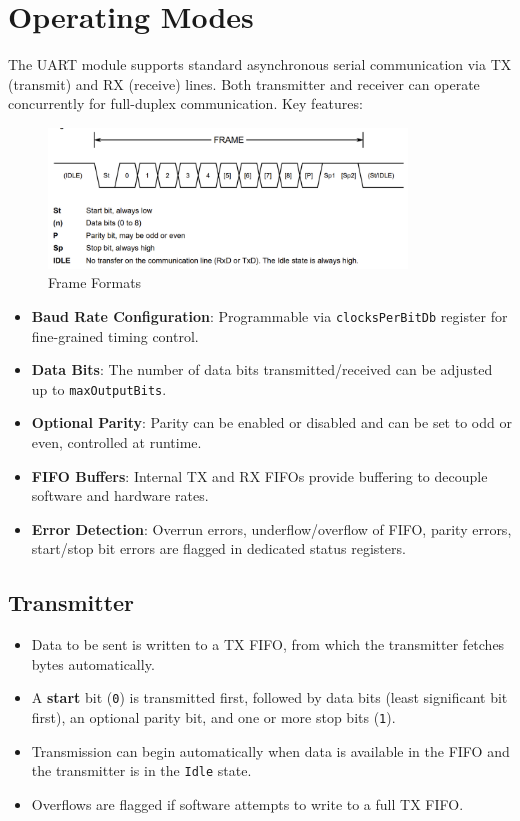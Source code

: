 \section{Operating Modes}

The UART module supports standard asynchronous serial communication via TX (transmit) and RX (receive) lines. Both transmitter and receiver can operate concurrently for full-duplex communication. Key features:

\begin{figure}[H]
    \centering
    \includegraphics[width=0.85\textwidth]{images/frame_format.png}
    \caption{Frame Formats}
    \label{fig:frame_formats}
  \end{figure}

  
\begin{itemize}
  \item \textbf{Baud Rate Configuration}: Programmable via \texttt{clocksPerBitDb} register for fine-grained timing control.
  \item \textbf{Data Bits}: The number of data bits transmitted/received can be adjusted up to \texttt{maxOutputBits}.
  \item \textbf{Optional Parity}: Parity can be enabled or disabled and can be set to odd or even, controlled at runtime.
  \item \textbf{FIFO Buffers}: Internal TX and RX FIFOs provide buffering to decouple software and hardware rates.
  \item \textbf{Error Detection}: Overrun errors, underflow/overflow of FIFO, parity errors, start/stop bit errors are flagged in dedicated status registers.
\end{itemize}

\subsection{Transmitter}
\begin{itemize}
  \item Data to be sent is written to a TX FIFO, from which the transmitter fetches bytes automatically.
  \item A \textbf{start} bit (\texttt{0}) is transmitted first, followed by data bits (least significant bit first), an optional parity bit, and one or more stop bits (\texttt{1}).
  \item Transmission can begin automatically when data is available in the FIFO and the transmitter is in the \texttt{Idle} state.
  \item Overflows are flagged if software attempts to write to a full TX FIFO.
\end{itemize}

